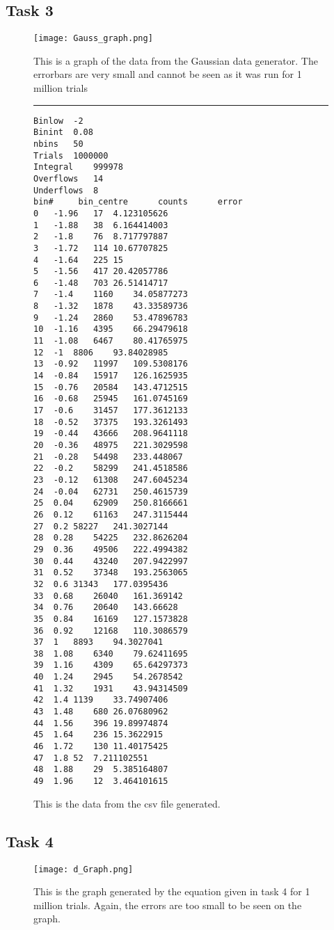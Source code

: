 \documentclass{article}
\begin{document}
\begin{center}
\subsection{Task 3}
\begin{figure}[h]
\texttt{[image: Gauss\_graph.png]}
\caption{This is a graph of the data from the Gaussian data generator. The errorbars are very small and cannot be seen as it was run for 1 million trials}
\hrule
\begin{lstlisting}
Binlow 	-2		
Binint 	0.08		
nbins  	50		
Trials 	1000000		
Integral 	999978		
Overflows 	14		
Underflows 	8		
bin# 	 bin_centre 	 counts 	 error
0	-1.96	17	4.123105626
1	-1.88	38	6.164414003
2	-1.8	76	8.717797887
3	-1.72	114	10.67707825
4	-1.64	225	15
5	-1.56	417	20.42057786
6	-1.48	703	26.51414717
7	-1.4	1160	34.05877273
8	-1.32	1878	43.33589736
9	-1.24	2860	53.47896783
10	-1.16	4395	66.29479618
11	-1.08	6467	80.41765975
12	-1	8806	93.84028985
13	-0.92	11997	109.5308176
14	-0.84	15917	126.1625935
15	-0.76	20584	143.4712515
16	-0.68	25945	161.0745169
17	-0.6	31457	177.3612133
18	-0.52	37375	193.3261493
19	-0.44	43666	208.9641118
20	-0.36	48975	221.3029598
21	-0.28	54498	233.448067
22	-0.2	58299	241.4518586
23	-0.12	61308	247.6045234
24	-0.04	62731	250.4615739
25	0.04	62909	250.8166661
26	0.12	61163	247.3115444
27	0.2	58227	241.3027144
28	0.28	54225	232.8626204
29	0.36	49506	222.4994382
30	0.44	43240	207.9422997
31	0.52	37348	193.2563065
32	0.6	31343	177.0395436
33	0.68	26040	161.369142
34	0.76	20640	143.66628
35	0.84	16169	127.1573828
36	0.92	12168	110.3086579
37	1	8893	94.3027041
38	1.08	6340	79.62411695
39	1.16	4309	65.64297373
40	1.24	2945	54.2678542
41	1.32	1931	43.94314509
42	1.4	1139	33.74907406
43	1.48	680	26.07680962
44	1.56	396	19.89974874
45	1.64	236	15.3622915
46	1.72	130	11.40175425
47	1.8	52	7.211102551
48	1.88	29	5.385164807
49	1.96	12	3.464101615
\end{lstlisting}
\caption{This is the data from the csv file generated.}
\end{figure}

\subsection{Task 4}
\begin{figure}[h]
\texttt{[image: d\_Graph.png]}
\caption{This is the graph generated by the equation given in task 4 for 1 million trials. Again, the errors are too small to be seen on the graph.}
\end{figure}

\end{center}
\end{document}

